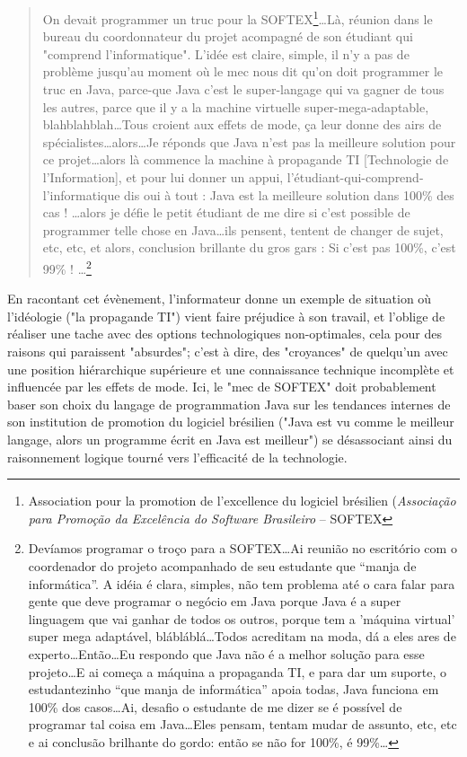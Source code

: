 \begin{quote}
On devait programmer un truc pour la SOFTEX\footnote{Association pour la promotion de l'excellence du logiciel brésilien (\emph{Associação para Promoção da Excelência do Software Brasileiro} -- SOFTEX}\ldots Là, réunion dans le bureau du coordonnateur du projet acompagné de son étudiant qui "comprend l'informatique". L'idée est claire, simple, il n'y a pas de problème jusqu'au moment où le mec nous dit qu'on doit programmer le truc en Java, parce-que Java c'est le super-langage qui va gagner de tous les autres, parce que il y a la machine virtuelle super-mega-adaptable, blahblahblah\ldots Tous croient aux effets de mode, ça leur donne des airs de spécialistes\ldots alors\ldots Je réponds que Java n'est pas la meilleure solution pour ce projet\ldots alors là commence la machine à propagande TI [Technologie de l'Information], et pour lui donner un appui, l'étudiant-qui-comprend-l'informatique dis oui à tout : Java est la meilleure solution dans 100\% des cas ! \ldots alors je défie le petit étudiant de me dire si c'est possible de programmer telle chose en Java\ldots ils pensent, tentent de changer de sujet, etc, etc, et alors, conclusion brillante du gros gars : Si c'est pas 100\%, c'est 99\% ! \ldots\footnote{Devíamos programar o troço para a SOFTEX\ldots Ai reunião no escritório com o coordenador do projeto acompanhado de seu estudante que “manja de informática”. A idéia é clara, simples, não tem problema até o cara falar para gente que deve programar o negócio em Java porque Java é a super linguagem que vai ganhar de todos os outros, porque tem a 'máquina virtual' super mega adaptável, blábláblá\ldots Todos acreditam na moda, dá a eles ares de experto\ldots Então\ldots Eu respondo que Java não é a melhor solução para esse projeto\ldots E ai começa a máquina a propaganda TI, e para dar um suporte, o estudantezinho “que manja de informática” apoia todas, Java funciona em 100\% dos casos\ldots Ai, desafio o estudante de me dizer se é possível de programar tal coisa em Java\ldots Eles pensam, tentam mudar de assunto, etc, etc e ai conclusão brilhante do gordo: então se não for 100\%, é 99\%\ldots}
\end{quote}

En racontant cet évènement, l'informateur donne un exemple de situation où l'idéologie ("la propagande TI") vient faire préjudice à son travail, et l'oblige de réaliser une tache avec des options technologiques non-optimales, cela pour des raisons qui paraissent "absurdes"; c'est à dire, des "croyances" de quelqu'un avec une position hiérarchique supérieure et une connaissance technique incomplète et influencée par les effets de mode. Ici, le "mec de SOFTEX" doit probablement baser son choix du langage de programmation Java sur les tendances internes de son institution de promotion du logiciel brésilien ("Java est vu comme le meilleur langage, alors un programme écrit en Java est meilleur") se désassociant ainsi du raisonnement logique tourné vers l'efficacité de la technologie.

